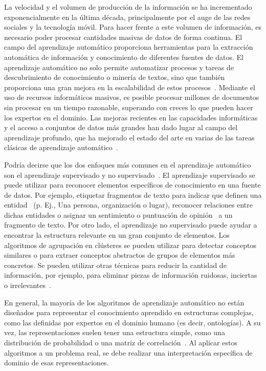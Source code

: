 La velocidad y el volumen de producción de la información se ha incrementado exponencialmente en la última década, principalmente por el auge de las redes sociales y la tecnología móvil. Para hacer frente a este volumen de información, es necesario poder procesar cantidades masivas de datos de forma continua. El campo del aprendizaje automático proporciona herramientas para la extracción automática de información y conocimiento de diferentes fuentes de datos. El aprendizaje automático no solo permite automatizar procesos y tareas de descubrimiento de conocimiento o minería de textos, sino que también proporciona una gran mejora en la escalabilidad de estos procesos~\cite{wu2014data}. Mediante el uso de recursos informáticos masivos, es posible procesar millones de documentos sin procesar en un tiempo razonable, superando con creces lo que pueden hacer los expertos en el dominio. Las mejoras recientes en las capacidades informáticas y el acceso a conjuntos de datos más grandes han dado lugar al campo del aprendizaje profundo, que ha mejorado el estado del arte en varias de las tareas clásicas de aprendizaje automático~\cite{lecun2015deep}.

Podría decirse que los dos enfoques más comunes en el aprendizaje automático son el aprendizaje supervisado y no supervisado~\cite{kevin2012machine}. El aprendizaje supervisado se puede utilizar para reconocer elementos específicos de conocimiento en una fuente de datos. Por ejemplo, etiquetar fragmentos de texto para indicar que definen una entidad~\cite{nadeau2007survey} (p. Ej., Una persona, organización o lugar), reconocer relaciones entre dichas entidades o asignar un sentimiento o puntuación de opinión~\cite{liu2012sentiment} a un fragmento de texto. Por otro lado, el aprendizaje no supervisado puede ayudar a encontrar la estructura relevante en un gran conjunto de elementos. Los algoritmos de agrupación en clústeres se pueden utilizar para detectar conceptos similares o para extraer conceptos abstractos de grupos de elementos más concretos. Se pueden utilizar otras técnicas para reducir la cantidad de información, por ejemplo, para eliminar piezas de información ruidosas, inciertas o irrelevantes~\cite{bingham2001random}.

En general, la mayoría de los algoritmos de aprendizaje automático no están diseñados para representar el conocimiento aprendido en estructuras complejas, como las definidas por expertos en el dominio humano (es decir, ontologías). A su vez, las representaciones suelen tener una estructura simple, como una distribución de probabilidad o una matriz de correlación~\cite{bengio2013representation}. Al aplicar estos algoritmos a un problema real, se debe realizar una interpretación específica de dominio de esas representaciones.

